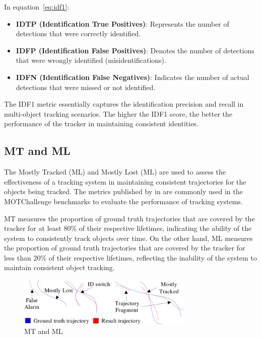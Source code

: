 In equation~\ref{eq:idf1}:

\begin{itemize}
    \item \textbf{IDTP (Identification True Positives)}: Represents the number of detections that were correctly identified.
    \item \textbf{IDFP (Identification False Positives)}: Denotes the number of detections that were wrongly identified (misidentifications).
    \item \textbf{IDFN (Identification False Negatives)}: Indicates the number of actual detections that were missed or not identified.
\end{itemize}

The IDF1 metric essentially captures the identification precision and recall in multi-object tracking scenarios. The higher the IDF1 score, the better the performance of the tracker in maintaining consistent identities.

\subsection{MT and ML}\label{subsec:mt_ml}
The Mostly Tracked (ML) and Mostly Lost (ML) are used to assess the effectiveness of a tracking system in maintaining consistent trajectories for the objects being tracked. The metrics published by \textcite{Wu06} in \citeyear{Wu06} are commonly used in the MOTChallenge benchmarks to evaluate the performance of tracking systems.

MT measures the proportion of ground truth trajectories that are covered by the tracker for at least 80\% of their respective lifetimes, indicating the ability of the system to consistently track objects over time. On the other hand, ML measures the proportion of ground truth trajectories that are covered by the tracker for less than 20\% of their respective lifetimes, reflecting the inability of the system to maintain consistent object tracking.

\begin{figure}[ht]
    \centering
    \includegraphics[width=0.75\textwidth]{resources/fig/Wu06-MT_ML.png}
    \caption{MT and ML~\cite[Fig.~5]{Wu06}}\label{fig:mt_ml}
\end{figure}

